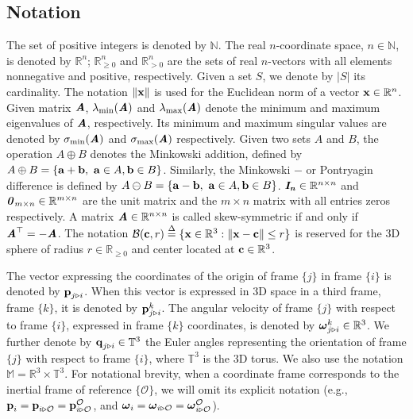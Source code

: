 \subsection{Notation}

The set of positive integers is denoted by $\mathbb{N}$. The real $n$-coordinate
space, $n\in\mathbb{N}$, is denoted by $\mathbb{R}^n$;
$\mathbb{R}^n_{\geq 0}$ and $\mathbb{R}^n_{> 0}$ are the sets of real
$n$-vectors with all elements nonnegative and positive, respectively. Given a
set $S$, we denote by $\lvert S\lvert$ its cardinality. The notation
$\|\bm{\mathbf{x}}\|$ is used for the Euclidean norm of a vector
$\bm{\mathbf{x}} \in \mathbb{R}^n$. Given matrix $\bm{\mathit{A}}$, $\lambda_{\text{min}}(\bm{\mathit{A}})$
and $\lambda_{\text{max}}(\bm{\mathit{A}})$
denote the minimum and maximum eigenvalues of $\bm{\mathit{A}}$, respectively.
Its minimum and maximum singular values are denoted by
$\sigma_{\text{min}}(\bm{\mathit{A}})$ and $\sigma_{\text{max}}(\bm{\mathit{A}})$ respectively.
Given two sets $A$ and $B$, the operation $A \oplus B$ denotes the Minkowski
addition, defined by
$A \oplus B = \{\bm{\mathbf{a}} + \bm{\mathbf{b}},\ \bm{\mathbf{a}} \in A, \bm{\mathbf{b}} \in B\}$. Similarly,
the Minkowski $-$ or Pontryagin difference is defined by
$A \ominus B = \{\bm{\mathbf{a}} - \bm{\mathbf{b}},\ \bm{\mathbf{a}} \in A, \bm{\mathbf{b}} \in B\}$.
$\bm{\mathit{I_n}} \in \mathbb{R}^{n \times n}$ and
$\bm{\mathit{0}}_{m \times n} \in \mathbb{R}^{m \times n}$
are the unit matrix and the $m \times n$ matrix with all entries zeros
respectively.  A matrix $\bm{\mathit{A}} \in \mathbb{R}^{n \times n}$ is called
skew-symmetric if and only if $\bm{\mathit{A}}^\top = -\bm{\mathit{A}}$. The notation
$\mathcal{B}(\bm{\mathbf{c}},r) \overset{\Delta}{=} \{\bm{\mathbf{x}} \in \mathbb{R}^3: \|\bm{\mathbf{x}}-\bm{\mathbf{c}}\| \leq r\}$
is reserved for the 3D sphere of radius $r \in \mathbb{R}_{\ge 0}$ and center
located at $\bm{\mathbf{c}}\in\mathbb{R}^{3}$.

The vector expressing the coordinates of the origin of frame $\{j\}$ in
frame $\{i\}$ is denoted by $\bm{\mathbf{p}}_{j \triangleright i}$. When this vector is
expressed in 3D space in a third frame, frame $\{k\}$, it is denoted by
$\bm{\mathbf{p}}_{j \triangleright i}^{k}$.
The angular velocity of frame $\{j\}$ with respect to frame $\{i\}$, expressed
in frame $\{k\}$ coordinates, is denoted by
$\bm{\mathbf{\omega}}^k_{j \triangleright i}\in \mathbb{R}^{3}$.
We further denote by $\bm{\mathbf{q}}_{j \triangleright i} \in \mathbb{T}^3$
the Euler angles representing the orientation of frame $\{j\}$ with respect to
frame $\{i\}$, where $\mathbb{T}^3$ is the $3$D torus.
We also use the notation $\mathbb{M} = \mathbb{R}^3\times \mathbb{T}^3$.
For notational brevity, when a coordinate frame corresponds to the inertial frame
of reference $\{\mathcal{O}\}$, we will omit its explicit notation
(e.g., $\bm{\mathbf{p}}_i = \bm{\mathbf{p}}_{i \triangleright \mathcal{O}} = \bm{\mathbf{p}}^\mathcal{O}_{i \triangleright \mathcal{O}}$, and
$\bm{\mathbf{\omega}}_i = \bm{\mathbf{\omega}}_{i \triangleright \mathcal{O}} = \bm{\mathbf{\omega}}^\mathcal{O}_{i \triangleright \mathcal{O}}$).

